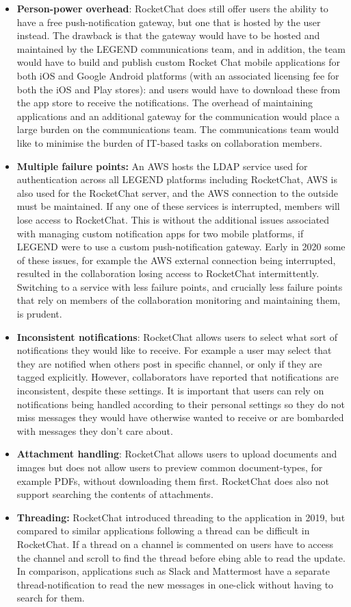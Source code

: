 \documentclass[11pt,letterpaper]{article}
\begin{document}
\begin{itemize}
\item \textbf{Person-power overhead}: RocketChat does still offer users the ability to have a free push-notification gateway, but one that is hosted by the user instead. The drawback is that the gateway would have to be hosted and maintained by the LEGEND communications team, and in addition, the team would have to build and publish custom Rocket Chat mobile applications for both iOS and Google Android platforms (with an associated licensing fee for both the iOS and Play stores): and users would have to download these from the app store to receive the notifications. The overhead of maintaining applications and an additional gateway for the communication would place a large burden on the communications team. The communications team would like to minimise the burden of IT-based tasks on collaboration members. 
\item \textbf{Multiple failure points:} An AWS hosts the LDAP service used for authentication across all LEGEND platforms including RocketChat, AWS is also used for the RocketChat server, and the AWS connection to the outside must be maintained. If any one of these services is interrupted, members will lose access to RocketChat. This is without the additional issues associated with managing custom notification apps for two mobile platforms, if LEGEND were to use a custom push-notification gateway. Early in 2020 some of these issues, for example the AWS external connection being interrupted, resulted in the collaboration losing access to RocketChat intermittently.  Switching to a service with less failure points, and crucially less failure points that rely on members of the collaboration monitoring and maintaining them, is prudent. 
\item \textbf{Inconsistent notifications}: RocketChat allows users to select what sort of notifications they would like to receive. For example a user may select that they are notified when others post in specific channel, or only if they are tagged explicitly. However, collaborators have reported that notifications are inconsistent, despite these settings. It is important that users can rely on notifications being handled according to their personal settings so they do not miss messages they would have otherwise wanted to receive or are bombarded with messages they don't care about.
\item \textbf{Attachment handling}: RocketChat allows users to upload documents and images but does not allow users to preview common document-types, for example PDFs, without downloading them first. RocketChat does also not support searching the contents of attachments. 
\item \textbf{Threading:} RocketChat introduced threading to the application in 2019, but compared to similar applications following a thread can be difficult in RocketChat. If a thread on a channel is commented on users have to access the channel and scroll to find the thread before ebing able to read the update. In comparison, applications such as Slack and Mattermost have a separate thread-notification to read the new messages in one-click without having to search for them.  
\end{itemize}
\end{document}
